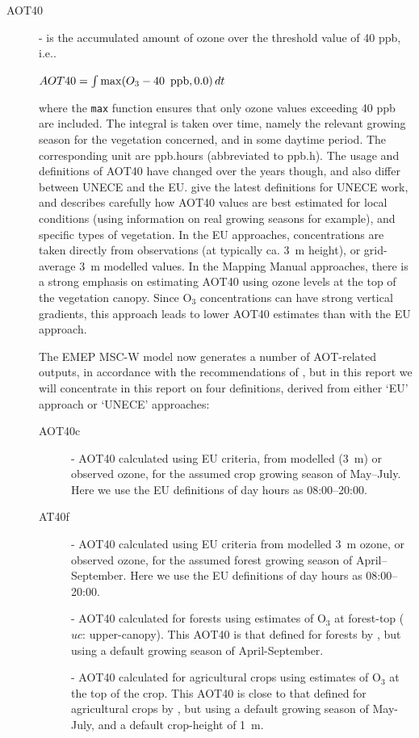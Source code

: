 \begin{description}
     \item[AOT40] -
is the accumulated amount of ozone over the threshold value of 40 ppb, i.e..

\begin{math}
AOT40 = \int \max(O_3 - 40 \mbox{\, ppb}, 0.0) \, dt
\end{math}


where the {\tt max} function ensures that only ozone values exceeding 40
ppb are included.  The integral is taken over time, namely the
relevant growing season for the vegetation concerned, and in some daytime period. The
corresponding unit are ppb.hours (abbreviated to ppb.h).  The usage
and definitions of AOT40 have changed over the years though, and also
differ between UNECE and the EU.
\citet{ICP2017}
give the latest definitions for UNECE work, and
describes carefully how AOT40 values are best estimated for local
conditions (using information on real growing seasons for example),
and specific types of vegetation.  In the EU approaches,  concentrations are taken directly from observations (at typically ca. 3~m height), or grid-average 3~m modelled values. In the Mapping Manual
\cite[]{MappingManual:Veg} approaches, there is a strong emphasis on
estimating AOT40 using ozone levels at the top of the vegetation
canopy. Since O$_3$ concentrations can have strong vertical gradients, this approach leads to lower AOT40 estimates than with the EU approach.

The EMEP MSC-W model now generates a number of AOT-related outputs,
in accordance with the recommendations of \cite{ICP2017}, but in this report we will concentrate in this report on four definitions, derived from either `EU' approach or `UNECE' approaches:

\begin{description}
   \item[AOT40c] - AOT40 calculated using EU criteria, from modelled (3~m) or observed ozone, for the assumed crop growing season of May--July. Here we use the EU definitions of day hours as 08:00--20:00.
   
   \item[AT40f] - AOT40 calculated  using EU criteria from modelled 3~m ozone, or observed ozone, for the assumed forest growing season of April--September. Here we use the EU definitions of day hours as 08:00--20:00.
   
   \item[\aotucf] %
     - AOT40 calculated for
   forests using estimates of O$_3$ at forest-top ($uc$:
   upper-canopy). This AOT40 is that defined for forests by
   \cite{MappingManual:Veg}, but using a default growing season of
   April-September.
   \item[\aotucc] %
     - AOT40
   calculated for agricultural crops using estimates of O$_3$ at the
   top of the crop. This AOT40 is close to that defined for
   agricultural crops by \cite{MappingManual:Veg}, but using a default
   growing season of May-July, and a default crop-height of 1~m.
\end{description}


\end{description}
